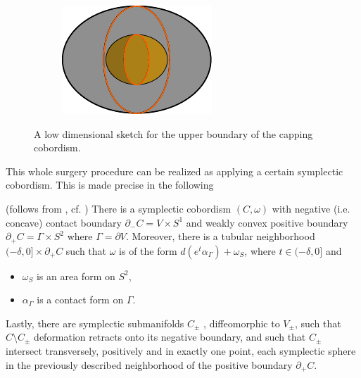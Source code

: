 \begin{figure}[ht]
\begin{subfigure}{.9\linewidth}
    \end{subfigure}
    \begin{subfigure}{.9\linewidth}
        \centering
        \includegraphics[trim=-.5cm -.5cm -.5cm -.5cm, width=.5\linewidth]{../images/gamma_times_s2.pdf}
    \end{subfigure}
    \caption[short]{A low dimensional sketch for the upper boundary of the capping cobordism.}
    \label{fig:cap_cobordism}
\end{figure}

This whole surgery procedure can be realized as applying a certain symplectic cobordism.
This is made precise in the following
\begin{lemma}(follows from \cite[Theorem 6.1]{MNW13}, cf. \cite[Lemma 6.1]{BGM22})\label{lem:capping_cobordism}
    There is a symplectic cobordism $(C, \omega)$ with negative (i.e. concave) 
    contact boundary $\partial_-C = V \times S^1$ and weakly convex positive boundary
    $\partial_+ C = \Gamma \times S^2$ where $\Gamma = \partial V$. 
    Moreover, there is a tubular neighborhood $(-\delta, 0] \times \partial_+ C$
    such that $\omega$ is of the form $d(e^t \alpha_\Gamma) + \omega_S$, 
    where $t \in (-\delta, 0]$ and 
    \begin{itemize}
        \item $\omega_S$ is an area form on $S^2$,
        \item $\alpha_\Gamma$ is a contact form on $\Gamma$.
    \end{itemize}
    Lastly, there are symplectic submanifolds $C_\pm$ , diffeomorphic to $V_\pm$, 
    such that $C\setminus C_\pm$ deformation retracts onto its negative boundary, 
    and such that $C_\pm$ intersect transversely, positively and in exactly one point, 
    each symplectic sphere in the previously described neighborhood 
    of the positive boundary $\partial_+ C$.
\end{lemma}

